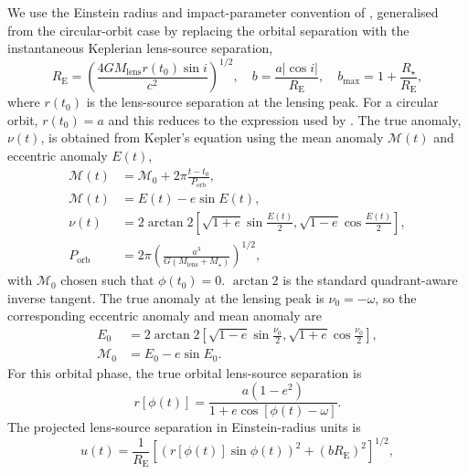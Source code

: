 \documentclass[fleqn,usenatbib]{mnras}
\begin{document}
We use the Einstein radius and impact-parameter convention of \cite{wiktorowicz_predicting_2021}, generalised from the circular-orbit case by replacing the orbital separation with the instantaneous Keplerian lens-source separation,
\begin{equation}
    R_\mathrm{E} = \left(\frac{4 G M_\mathrm{lens} r(t_0) \sin i}{c^2}\right)^{1/2},
    \quad
    b = \frac{a |\cos i|}{R_\mathrm{E}},
    \quad
    b_\mathrm{max} = 1 + \frac{R_\star}{R_\mathrm{E}},
\end{equation}
where $r(t_0)$ is the lens-source separation at the lensing peak. For a circular orbit, $r(t_0)=a$ and this reduces to the expression used by \cite{wiktorowicz_predicting_2021}. The true anomaly, $\nu(t)$, is obtained from Kepler's equation using the mean anomaly $\mathcal{M}(t)$ and eccentric anomaly $E(t)$,
\begin{align}
    \mathcal{M}(t) & = \mathcal{M}_0 + 2\pi\frac{t - t_0}{P_\mathrm{orb}}, \\
    \mathcal{M}(t) & = E(t) - e\sin E(t),                                  \\
    \nu(t)         & = 2\arctan2\left[
        \sqrt{1+e}\sin\frac{E(t)}{2},
        \sqrt{1-e}\cos\frac{E(t)}{2}
        \right],                                                           \\
    P_\mathrm{orb} & =
    2\pi\left(\frac{a^3}{G(M_\mathrm{lens} + M_\star)}\right)^{1/2},
\end{align}
with $\mathcal{M}_0$ chosen such that $\phi(t_0)=0$. $\arctan2$ is the standard quadrant-aware inverse tangent. The true anomaly at the lensing peak is $\nu_0=-\omega$, so the corresponding eccentric anomaly and mean anomaly are
\begin{align}
    E_0           & = 2\arctan2\left[
        \sqrt{1-e}\sin\frac{\nu_0}{2},
        \sqrt{1+e}\cos\frac{\nu_0}{2}
        \right],                        \\
    \mathcal{M}_0 & = E_0 - e\sin E_0 .
\end{align}
For this orbital phase, the true orbital lens-source separation is
\begin{equation}
    r[\phi(t)] =
    \frac{a(1 - e^2)}
    {1 + e\cos[\phi(t) - \omega]}.
\end{equation}
The projected lens-source separation in Einstein-radius units is
\begin{equation}
    u(t) = \frac{1}{R_\mathrm{E}}
    \left[
        \left(r[\phi(t)] \sin\phi(t)\right)^2
        + \left(b R_\mathrm{E}\right)^2
        \right]^{1/2},
\end{equation}
\end{document}
